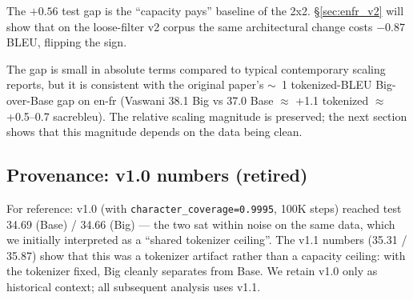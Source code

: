 The $+0.56$ test gap is the ``capacity pays'' baseline of the 2x2. \S\ref{sec:enfr_v2} will show that on the loose-filter v2 corpus the same architectural change costs $-0.87$ BLEU, flipping the sign.

The gap is small in absolute terms compared to typical contemporary scaling reports, but it is consistent with the original paper's $\sim$~1 tokenized-BLEU Big-over-Base gap on en-fr (Vaswani 38.1 Big vs 37.0 Base $\approx$ +1.1 tokenized $\approx$ +0.5--0.7 sacrebleu). The relative scaling magnitude is preserved; the next section shows that this magnitude depends on the data being clean.

\subsection{Provenance: v1.0 numbers (retired)}
For reference: v1.0 (with \texttt{character\_coverage=0.9995}, 100K steps) reached test 34.69 (Base) / 34.66 (Big) --- the two sat within noise on the same data, which we initially interpreted as a ``shared tokenizer ceiling''. The v1.1 numbers (35.31 / 35.87) show that this was a tokenizer artifact rather than a capacity ceiling: with the tokenizer fixed, Big cleanly separates from Base. We retain v1.0 only as historical context; all subsequent analysis uses v1.1.
